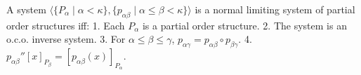 A system $\langle \{P_\alpha \mid \alpha < \kappa\}, \{p_{\alpha\beta} \mid \alpha \leq \beta < \kappa\} \rangle$ is a normal limiting system of partial order structures iff:
1. Each $P_\alpha$ is a partial order structure.
2. The system is an o.c.o. inverse system.
3. For $\alpha \leq \beta \leq \gamma$, $p_{\alpha\gamma} = p_{\alpha\beta} \circ p_{\beta\gamma}$.
4. $p_{\alpha\beta}''[x]_{P_\beta} = [p_{\alpha\beta}(x)]_{P_\alpha}$.
